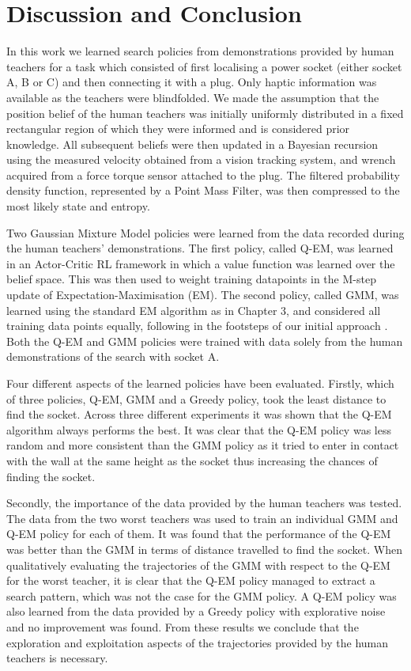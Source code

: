 \section{Discussion and Conclusion}\label{ch4:conclusion}
%
%
%

In this work we learned search policies from demonstrations provided by human teachers for a task
which consisted of first localising a power socket (either socket A, B or C) and then connecting it with a plug. Only haptic information 
was available as the teachers were blindfolded. We made the assumption that the position belief of the human teachers 
was initially uniformly distributed in a fixed rectangular region of which they were 
informed and is considered prior knowledge. All subsequent beliefs were then updated in a Bayesian recursion 
using the measured velocity obtained from a vision tracking system, and wrench acquired from a force torque sensor attached 
to the plug. The filtered probability density function, represented by a Point Mass Filter, was then compressed to the 
most likely state and entropy.

Two Gaussian Mixture Model policies were learned from the data recorded during the human teachers' demonstrations. 
The first policy, called Q-EM, was learned in an Actor-Critic RL framework in which a value function was learned over 
the belief space. This was then used to weight training datapoints in the M-step update of Expectation-Maximisation (EM). The second 
policy, called GMM, was learned using the standard EM algorithm as in Chapter 3, and considered all training data points equally,
following in the footsteps of our initial approach \cite{Chambrier2014}. Both the Q-EM and GMM policies were trained 
with data solely from the human demonstrations of the search with socket A.

Four different aspects of the learned policies have been evaluated. Firstly, which of three policies, Q-EM, GMM and a Greedy policy, 
took the least distance to find the socket. Across three different experiments it was shown that the Q-EM algorithm always performs
the best. It was clear that the Q-EM policy was less random and more consistent than the GMM policy as it tried to enter in 
contact with the wall at the same height as the socket thus increasing the chances of finding the socket.

Secondly, the importance of the data provided by the human teachers was tested. The data from the two worst teachers was used to 
train an individual GMM and Q-EM policy for each of them. It was found that the performance of the Q-EM was better than the GMM in terms 
of distance travelled to find the socket. When qualitatively evaluating the trajectories of the GMM with respect to the 
Q-EM for the worst teacher, it is clear that the Q-EM policy managed to extract a search pattern, which was not the case 
for the GMM policy. A Q-EM policy was also learned from the data provided by a Greedy policy with explorative noise 
and no improvement was found. From these results we conclude that the exploration and exploitation aspects of the trajectories 
provided by the human teachers is necessary.

